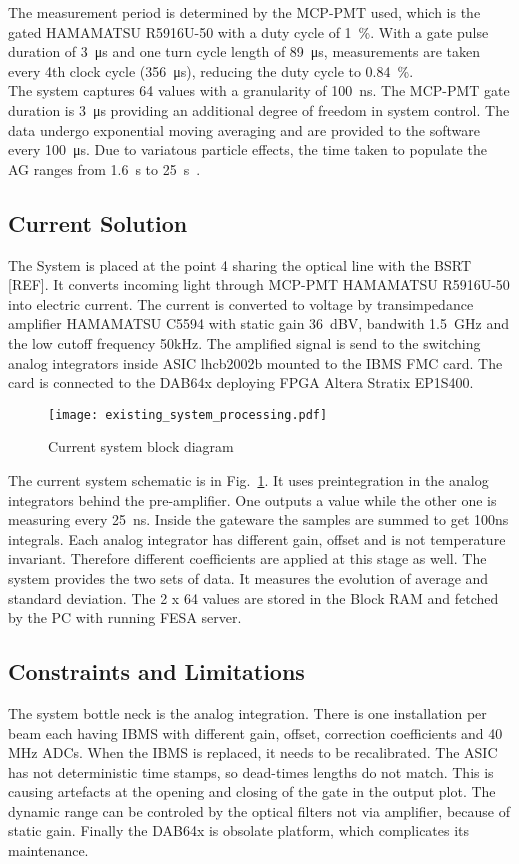 The measurement period is determined by the MCP-PMT used, which is the gated
HAMAMATSU R5916U-50 with a duty cycle of \SI{1}{\%}. With a gate pulse duration
of \SI{3}{\micro\second} and one turn cycle length of \SI{89}{\micro\second},
measurements are taken every 4th clock cycle (\SI{356}{\micro\second}),
reducing the duty cycle to \SI{0.84}{\%}.\\
The system captures 64 values with a granularity of \SI{100}{\nano\second}. The
MCP-PMT gate duration is \SI{3}{\micro\second} providing an additional degree of
freedom in system control. The data undergo exponential moving
averaging and are provided to the software every \SI{100}{\micro\second}. Due to
variatous particle effects, the time taken to populate the AG ranges from
\SI{1.6}{\second} to \SI{25}{\second}~\cite{high_sensitivity_measurement}.

\subsection{Current Solution}
The System is placed at the point 4 sharing the optical line with the BSRT
[REF]. It converts incoming light through MCP-PMT HAMAMATSU R5916U-50 into
electric current. The current is converted to voltage by transimpedance
amplifier HAMAMATSU C5594 with static gain \SI{36}{dBV}, bandwith \SI{1.5}{GHz}
and the low cutoff frequency 50kHz.
The amplified signal is send to the switching analog integrators inside ASIC
lhcb2002b mounted to the IBMS FMC card. The card is connected to the DAB64x
deploying FPGA Altera Stratix EP1S400. 
\begin{figure}[!tbh]
    \centering
    \texttt{[image: existing\_system\_processing.pdf]}
    \caption{Current system block diagram}
    \label{fig:current_system_processing}
\end{figure}
The current system schematic is in Fig.~\ref{fig:current_system_processing}. It
uses preintegration in the analog integrators behind the pre-amplifier. One
outputs a value while the other one is measuring every \SI{25}{ns}. Inside the
gateware the samples are summed to get 100ns integrals. Each analog integrator
has different gain, offset and is not temperature invariant. Therefore
different coefficients are applied at this stage as well. 
The system provides the two sets of data. It measures the evolution of average
and standard deviation. The 2 x 64 values are stored in the Block RAM and
fetched by the PC with running FESA server.

\subsection{Constraints and Limitations}
The system bottle neck is the analog integration. There is one installation per
beam each having IBMS with different gain, offset, correction coefficients and
40 MHz ADCs. When the IBMS is replaced, it needs to be recalibrated. The ASIC
has not deterministic time stamps, so dead-times lengths do not match. This is
causing artefacts at the opening and closing of the gate in the output plot.
The dynamic range can be controled by the optical filters not via amplifier,
because of static gain. Finally the DAB64x is obsolate platform, which
complicates its maintenance.   

